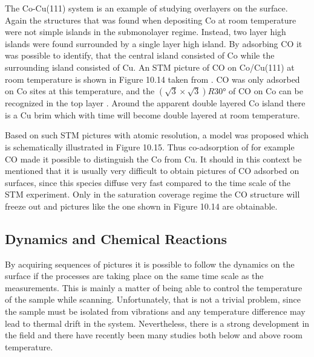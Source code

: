 \vspace*{11cm}


\vspace{1cm} 

The Co-Cu(111) system is an example of studying overlayers on the surface. Again the structures that was found when depositing Co at room temperature were not simple islands in the submonolayer regime. Instead, two layer high islands were found surrounded by a single layer high island. By adsorbing CO it was possible to identify,  that the central island consisted of Co while the surrounding island consisted of Cu. An STM picture of CO on Co/Cu(111) at room temperature is shown in Figure 10.14 taken from \cite{Morten}. CO was only adsorbed on Co sites at this temperature, and the $(\sqrt{3}\times\sqrt{3})R\ang{30}$ of CO on Co can be recognized in the top layer \cite{Morten}. Around the apparent double layered Co island there is a Cu brim which with time will become double layered at room temperature. 

\vspace*{11cm}


\vspace{1cm} 

Based on such STM pictures with atomic resolution, a model was proposed which is schematically illustrated in Figure 10.15. Thus co-adsorption of for example CO made it possible to distinguish the Co from Cu. It should in this context be mentioned that it is usually very difficult to obtain pictures of CO adsorbed on surfaces, since this species diffuse very fast compared to the time scale of the STM experiment. Only in the saturation coverage regime the CO structure will freeze out and pictures like the one shown in Figure 10.14 are  obtainable.

\vspace*{11cm}


\vspace{1cm} 

\subsection{Dynamics and Chemical Reactions}
By acquiring sequences of pictures it is possible to follow the dynamics on the surface if the processes are taking place on the same time scale as the measurements. This is mainly a matter of being able to control the temperature of the sample while scanning. Unfortunately, that is not a trivial problem, since the sample must be isolated from vibrations and any temperature difference may lead to thermal drift in the system. Nevertheless, there is a strong development in the field and there have recently been many studies both below and above room temperature. 

